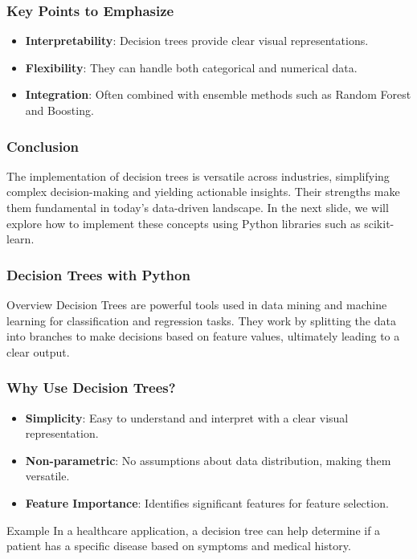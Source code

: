 \documentclass[aspectratio=169]{beamer}
\begin{document}
\begin{frame}[fragile]
    \frametitle{Key Points to Emphasize}
    \begin{itemize}
        \item \textbf{Interpretability}: Decision trees provide clear visual representations.
        \item \textbf{Flexibility}: They can handle both categorical and numerical data.
        \item \textbf{Integration}: Often combined with ensemble methods such as Random Forest and Boosting.
    \end{itemize}
\end{frame}

\begin{frame}[fragile]
    \frametitle{Conclusion}
    The implementation of decision trees is versatile across industries, simplifying complex decision-making and yielding actionable insights. Their strengths make them fundamental in today's data-driven landscape. In the next slide, we will explore how to implement these concepts using Python libraries such as scikit-learn.
\end{frame}

\begin{frame}[fragile]
    \frametitle{Decision Trees with Python}
    \begin{block}{Overview}
        Decision Trees are powerful tools used in data mining and machine learning for classification and regression tasks. They work by splitting the data into branches to make decisions based on feature values, ultimately leading to a clear output.
    \end{block}
\end{frame}

\begin{frame}[fragile]
    \frametitle{Why Use Decision Trees?}
    \begin{itemize}
        \item \textbf{Simplicity}: Easy to understand and interpret with a clear visual representation.
        \item \textbf{Non-parametric}: No assumptions about data distribution, making them versatile.
        \item \textbf{Feature Importance}: Identifies significant features for feature selection.
    \end{itemize}
    \begin{block}{Example}
        In a healthcare application, a decision tree can help determine if a patient has a specific disease based on symptoms and medical history.
    \end{block}
\end{frame}
\end{document}
